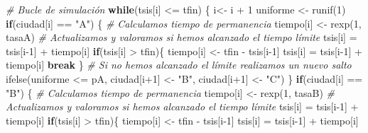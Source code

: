 \documentclass[
]{book}
\newenvironment{Shaded}{\begin{snugshade}}{\end{snugshade}}
\newcommand{\CommentTok}[1]{\textcolor[rgb]{0.56,0.35,0.01}{\textit{#1}}}
\newcommand{\ControlFlowTok}[1]{\textcolor[rgb]{0.13,0.29,0.53}{\textbf{#1}}}
\newcommand{\DecValTok}[1]{\textcolor[rgb]{0.00,0.00,0.81}{#1}}
\newcommand{\FunctionTok}[1]{\textcolor[rgb]{0.00,0.00,0.00}{#1}}
\newcommand{\NormalTok}[1]{#1}
\newcommand{\OtherTok}[1]{\textcolor[rgb]{0.56,0.35,0.01}{#1}}
\newcommand{\SpecialCharTok}[1]{\textcolor[rgb]{0.00,0.00,0.00}{#1}}
\newcommand{\StringTok}[1]{\textcolor[rgb]{0.31,0.60,0.02}{#1}}
\theoremstyle{definition}
\theoremstyle{definition}
\theoremstyle{definition}
\theoremstyle{definition}
\theoremstyle{remark}
\begin{document}
\begin{Shaded}
\begin{Highlighting}[]
  \CommentTok{\# Bucle de simulación}
  \ControlFlowTok{while}\NormalTok{(tsis[i] }\SpecialCharTok{\textless{}=}\NormalTok{ tfin)}
\NormalTok{  \{}
\NormalTok{    i}\OtherTok{\textless{}{-}}\NormalTok{ i }\SpecialCharTok{+} \DecValTok{1}
\NormalTok{    uniforme }\OtherTok{\textless{}{-}} \FunctionTok{runif}\NormalTok{(}\DecValTok{1}\NormalTok{)}
    \ControlFlowTok{if}\NormalTok{(ciudad[i] }\SpecialCharTok{==} \StringTok{"A"}\NormalTok{)}
\NormalTok{      \{}
        \CommentTok{\# Calculamos tiempo de permanencia}
\NormalTok{        tiempo[i] }\OtherTok{\textless{}{-}} \FunctionTok{rexp}\NormalTok{(}\DecValTok{1}\NormalTok{, tasaA)}
        \CommentTok{\# Actualizamos y valoramos si hemos alcanzado el tiempo límite}
\NormalTok{        tsis[i] }\OtherTok{=}\NormalTok{ tsis[i}\DecValTok{{-}1}\NormalTok{] }\SpecialCharTok{+}\NormalTok{ tiempo[i]}
        \ControlFlowTok{if}\NormalTok{(tsis[i] }\SpecialCharTok{\textgreater{}}\NormalTok{ tfin)\{}
\NormalTok{            tiempo[i] }\OtherTok{\textless{}{-}}\NormalTok{ tfin }\SpecialCharTok{{-}}\NormalTok{ tsis[i}\DecValTok{{-}1}\NormalTok{] }
\NormalTok{            tsis[i] }\OtherTok{=}\NormalTok{ tsis[i}\DecValTok{{-}1}\NormalTok{] }\SpecialCharTok{+}\NormalTok{ tiempo[i]}
            \ControlFlowTok{break}
\NormalTok{          \}}
        \CommentTok{\# Si no hemos alcanzado el límite realizamos un nuevo salto}
        \FunctionTok{ifelse}\NormalTok{(uniforme }\SpecialCharTok{\textless{}=}\NormalTok{ pA, ciudad[i}\SpecialCharTok{+}\DecValTok{1}\NormalTok{] }\OtherTok{\textless{}{-}} \StringTok{"B"}\NormalTok{, ciudad[i}\SpecialCharTok{+}\DecValTok{1}\NormalTok{] }\OtherTok{\textless{}{-}} \StringTok{"C"}\NormalTok{)}
\NormalTok{      \}}
    \ControlFlowTok{if}\NormalTok{(ciudad[i] }\SpecialCharTok{==} \StringTok{"B"}\NormalTok{)}
\NormalTok{      \{}
        \CommentTok{\# Calculamos tiempo de permanencia}
\NormalTok{        tiempo[i] }\OtherTok{\textless{}{-}} \FunctionTok{rexp}\NormalTok{(}\DecValTok{1}\NormalTok{, tasaB)}
        \CommentTok{\# Actualizamos y valoramos si hemos alcanzado el tiempo límite}
\NormalTok{        tsis[i] }\OtherTok{=}\NormalTok{ tsis[i}\DecValTok{{-}1}\NormalTok{] }\SpecialCharTok{+}\NormalTok{ tiempo[i]}
        \ControlFlowTok{if}\NormalTok{(tsis[i] }\SpecialCharTok{\textgreater{}}\NormalTok{ tfin)\{}
\NormalTok{            tiempo[i] }\OtherTok{\textless{}{-}}\NormalTok{ tfin }\SpecialCharTok{{-}}\NormalTok{ tsis[i}\DecValTok{{-}1}\NormalTok{] }
\NormalTok{            tsis[i] }\OtherTok{=}\NormalTok{ tsis[i}\DecValTok{{-}1}\NormalTok{] }\SpecialCharTok{+}\NormalTok{ tiempo[i]}

\end{Highlighting}
\end{Shaded}
\end{document}

